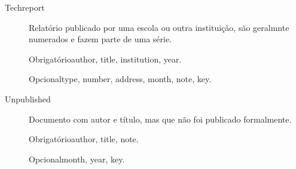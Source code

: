 \documentclass[article,openany]{memoir}
\newcommand{\obrigatorios}{%
   \par Obrigatório\dotfill\ignorespaces}
\newcommand{\opcionais}{
   \par Opcional\dotfill\ignorespaces}
\begin{document}
\begin{description}

\item[Techreport]
Relatório publicado por uma escola ou outra instituição, são geralmnte
numerados e fazem parte de uma série.

  \obrigatorios author, title, institution, year.

  \opcionais type, number, address, month, note, key.


\item[Unpublished]
Documento com autor e título, mas que não foi publicado formalmente.

  \obrigatorios author, title, note.

  \opcionais month, year, key.


\end{description}
\end{document}
